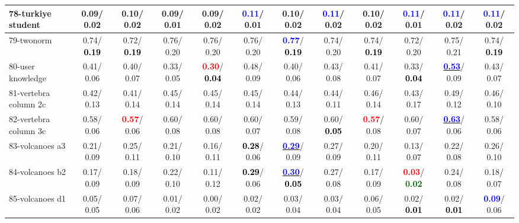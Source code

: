 \begin{table}[h]
\begin{center}
{\begin{tabular}{lc|c|c|c|c|c|c|c|c|c|c}
78-turkiye student &   0.09/  0.02 &   0.10/  0.02 &   0.09/  0.01 &   0.09/  0.02 & \textcolor{blue}{\textbf{  0.11}}/  0.01 &   0.10/  0.02 & \textcolor{blue}{\textbf{  0.11}}/  0.02 &   0.10/  0.02 & \textcolor{blue}{\textbf{  0.11}}/  0.01 & \textcolor{blue}{\textbf{  0.11}}/  0.02 & \textcolor{blue}{\textbf{  0.11}}/  0.02 \\ \hline
79-twonorm &   0.74/\textcolor{black}{\textbf{  0.19}} &   0.72/\textcolor{black}{\textbf{  0.19}} &   0.76/  0.20 &   0.76/  0.20 &   0.76/  0.20 & \textcolor{blue}{\textbf{  0.77}}/\textcolor{black}{\textbf{  0.19}} &   0.74/  0.20 &   0.74/\textcolor{black}{\textbf{  0.19}} &   0.72/  0.20 &   0.75/  0.21 &   0.74/\textcolor{black}{\textbf{  0.19}} \\
80-user knowledge &   0.41/  0.06 &   0.40/  0.07 &   0.33/  0.05 & \textcolor{red}{\textbf{  0.30}}/\textcolor{black}{\textbf{  0.04}} &   0.48/  0.09 &   0.40/  0.06 &   0.43/  0.08 &   0.41/  0.07 &   0.33/\textcolor{black}{\textbf{  0.04}} & \underline{\textcolor{blue}{\textbf{  0.53}}}/  0.09 &   0.43/  0.07 \\
81-vertebra column 2c &   0.42/  0.13 &   0.41/  0.14 &   0.45/  0.14 &   0.45/  0.14 &   0.45/  0.14 &   0.44/  0.13 &   0.44/  0.11 &   0.46/  0.14 &   0.43/  0.17 &   0.49/  0.12 &   0.46/  0.10 \\
82-vertebra column 3c &   0.58/  0.06 & \textcolor{red}{\textbf{  0.57}}/  0.06 &   0.60/  0.08 &   0.60/  0.08 &   0.60/  0.07 &   0.59/  0.08 &   0.60/\textcolor{black}{\textbf{  0.05}} & \textcolor{red}{\textbf{  0.57}}/  0.08 &   0.60/  0.07 & \underline{\textcolor{blue}{\textbf{  0.63}}}/  0.06 &   0.58/  0.06 \\
83-volcanoes a3 &   0.21/  0.09 &   0.25/  0.11 &   0.21/  0.10 &   0.16/  0.11 & \textcolor{black}{\textbf{  0.28}}/  0.06 & \underline{\textcolor{blue}{\textbf{  0.29}}}/  0.09 &   0.27/  0.09 &   0.20/  0.11 &   0.13/  0.07 &   0.22/  0.08 &   0.26/  0.10 \\
84-volcanoes b2 &   0.17/  0.09 &   0.18/  0.09 &   0.22/  0.10 &   0.11/  0.12 & \textcolor{black}{\textbf{  0.29}}/  0.06 & \underline{\textcolor{blue}{\textbf{  0.30}}}/\textcolor{black}{\textbf{  0.05}} &   0.27/  0.08 &   0.17/  0.09 & \textcolor{red}{\textbf{  0.03}}/\textcolor{darkgreen}{\textbf{  0.02}} &   0.24/  0.08 &   0.18/  0.07 \\
85-volcanoes d1 &   0.05/  0.05 &   0.07/  0.06 &   0.01/  0.02 &   0.00/  0.02 &   0.02/  0.02 &   0.03/  0.04 &   0.03/  0.04 &   0.06/  0.05 &   0.02/\textcolor{black}{\textbf{  0.01}} &   0.02/\textcolor{black}{\textbf{  0.01}} & \textcolor{blue}{\textbf{  0.09}}/  0.06 \\ \hline

\end{tabular}}
\end{center}
\end{table}
